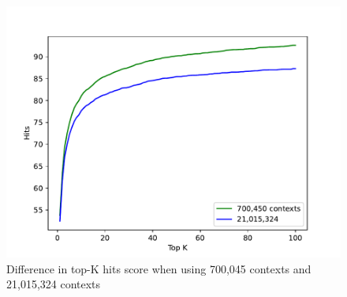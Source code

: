 \documentclass[12pt, sort&compress]{report}
\begin{document}
\begin{figure}
	\centering
	\includegraphics[scale=0.7]{images/PDF/experiments/700Kvs21M.pdf}
	\caption {Difference in top-K hits score when using 700,045 contexts and 21,015,324 contexts}
	\label{fig:18}
\end{figure}
\end{document}
